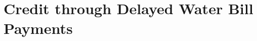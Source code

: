\documentclass[12pt]{article}
\begin{document}






\section{Credit through Delayed Water Bill Payments}\label{section:descriptives}

\end{document}
